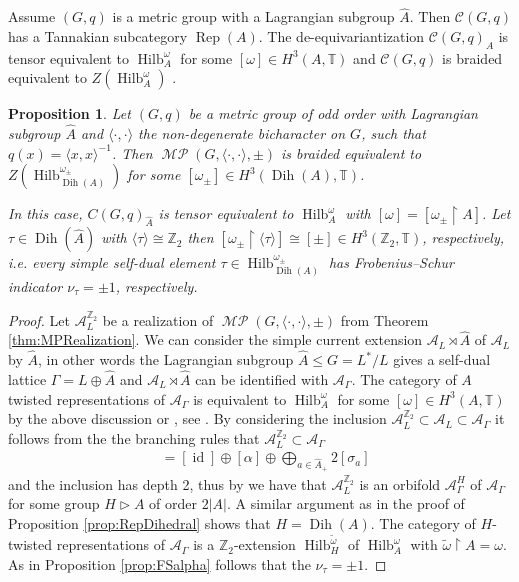 \documentclass[twoside,11pt,reqno]{amsart}
\makeatletter
\newtheorem{prop}[thm]{Proposition}
\theoremstyle{definition}
\theoremstyle{remark}
\newcommand{\cC}{\mathcal{C}}
\newcommand{\A}{\mathcal{A}}
\newcommand{\TT}{\mathbb{T}}
\newcommand{\ZZ}{\mathbb{Z}}
\DeclareMathOperator{\Rep}{Rep}
\DeclareMathOperator{\id}{id}
\DeclareRobustCommand{\ie}{i.e.\@\xspace}
\DeclareMathOperator{\Dih}{Dih}
\DeclareMathOperator*{\MP}{\mathcal{MP}}
\DeclareMathOperator{\Vect}{Hilb}
\newcommand{\bi}[2]{\langle #1,#2\rangle}
\newcommand{\bislotslot}{\bi\cdot\cdot}
\makeatother
\begin{document}
Assume $(G,q)$ is a metric group with a Lagrangian subgroup $\hat A$. 
Then $\cC(G,q)$ has a Tannakian subcategory $\Rep(A)$. 
The de-equivariantization $\cC(G,q)_{A}$ is tensor equivalent to 
$\Vect_{A}^\omega$ for some $[\omega]\in H^3(A,\TT)$ 
  \cite[Proposition 4.58]{DrGeNiOs2010}
and $\cC(G,q)$ is braided equivalent to $Z(\Vect_{A}^\omega)$
  \cite[Proposition 4.8]{DaMgNiOs2013}.

\begin{prop} 
  \label{prop:TwistedDoubleRealization}
  Let $(G,q)$ be a metric group of odd order with Lagrangian subgroup $\hat A$
  and $\bislotslot$ the non-degenerate bicharacter on $G$, such that 
    $q(x)=\bi x x ^{-1}$.
  Then $\MP(G,\bislotslot,\pm)$ is braided equivalent to 
    $Z(\Vect_{\Dih(A)}^{\omega_\pm})$ 
  for some $[\omega_\pm]\in H^3(\Dih(A),\TT)$.

  In this case, $C(G,q)_{\hat A}$ is tensor equivalent to $\Vect_{A}^\omega$
  with $[\omega]=[\omega_\pm\restriction A]$.
  Let $\tau \in \Dih(\hat A)$ with $\langle \tau\rangle \cong \ZZ_2$ then
  $[\omega_\pm\restriction \langle\tau\rangle]\cong [\pm]\in H^3(\ZZ_2,\TT)$, 
  respectively, \ie every simple self-dual element 
  $\tau\in \Vect_{\Dih( A)}^{\omega_\pm}$ has Frobenius--Schur indicator
  $\nu_\tau=\pm 1$, respectively.
\end{prop}
\begin{proof}
  Let $\A_L^{\ZZ_2}$ be a realization of $\MP(G,\bislotslot,\pm)$ from Theorem 
  \ref{thm:MPRealization}. 
  We can consider the simple current extension $\A_L\rtimes \hat A$ of $\A_L$ by
  $\hat A$, in other words the Lagrangian subgroup $\hat A\leq G=L^\ast / L$ 
  gives a self-dual lattice $\Gamma=L\oplus \hat A$ and $\A_L\rtimes \hat A$ can  be identified with $\A_\Gamma$. 
  The category of $A$ twisted representations of $\A_\Gamma$ is equivalent to 
  $\Vect_{A}^\omega$ for some $[\omega]\in H^3(A,\TT)$ by the above discussion
  or \cite[3.6 Corollary]{Mg2010}, see \cite[Theorem 1.7]{Bi2016}.
  By considering the inclusion $\A_L^{\ZZ_2}\subset\A_L\subset \A_\Gamma$ it 
  follows from the the branching rules that $\A_L^{\ZZ_2}\subset \A_\Gamma$
  \begin{align}
    [\theta]&=[\id]\oplus[\alpha]\oplus\bigoplus_{a\in \hat A_+}2[\sigma_a]
  \end{align}
  and the inclusion has depth 2, thus by \cite[Corollary 1.2]{Bi2016} we have 
  that $\A_L^{\ZZ_2}$ is an orbifold $\A_{\Gamma}^{H}$ of $\A_\Gamma$ for some 
  group $H\triangleright A$ of order $2|A|$. 
  A similar argument as in the proof of Proposition \ref{prop:RepDihedral} 
  shows that $H=\Dih(A)$.
  The category of $H$-twisted representations of $\A_\Gamma$ is a
  $\ZZ_2$-extension $\Vect_{H}^{\tilde\omega}$ of $\Vect_{ A}^\omega$ with 
  $\tilde \omega\restriction A = \omega$.
  As in Proposition \ref{prop:FSalpha} follows that the $\nu_\tau=\pm1$.
\end{proof}
\end{document}
